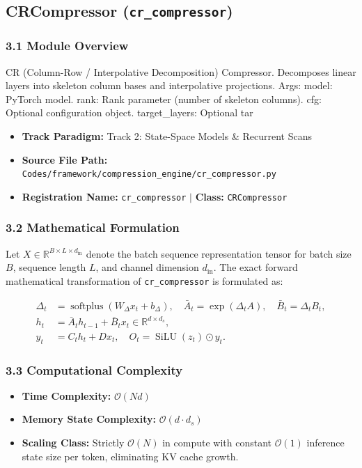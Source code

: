 \subsection{CRCompressor (\texttt{cr\_compressor})}
\label{sec:app_module_cr_compressor}

\subsubsection*{3.1 Module Overview}
CR (Column-Row / Interpolative Decomposition) Compressor. Decomposes linear layers into skeleton column bases and interpolative projections.  Args:     model: PyTorch model.     rank: Rank parameter (number of skeleton columns).     cfg: Optional configuration object.     target\_layers: Optional tar
\begin{itemize}
    \item \textbf{Track Paradigm:} Track 2: State-Space Models & Recurrent Scans
    \item \textbf{Source File Path:} \texttt{Codes/framework/compression\_engine/cr\_compressor.py}
    \item \textbf{Registration Name:} \texttt{cr\_compressor} $\mid$ \textbf{Class:} \texttt{CRCompressor}
\end{itemize}

\subsubsection*{3.2 Mathematical Formulation}
Let $X \in \mathbb{R}^{B \times L \times d_{\text{in}}}$ denote the batch sequence representation tensor for batch size $B$, sequence length $L$, and channel dimension $d_{\text{in}}$. The exact forward mathematical transformation of \texttt{cr\_compressor} is formulated as:

\begin{align}
\Delta_t &= \operatorname{softplus}(W_\Delta x_t + b_\Delta), \quad \bar{A}_t = \exp(\Delta_t A), \quad \bar{B}_t = \Delta_t B_t, \\
h_t &= \bar{A}_t h_{t-1} + \bar{B}_t x_t \in \mathbb{R}^{d \times d_s}, \\
y_t &= C_t h_t + D x_t, \quad O_t = \operatorname{SiLU}(z_t) \odot y_t.
\end{align}


\subsubsection*{3.3 Computational Complexity}
\begin{itemize}
    \item \textbf{Time Complexity:} $\mathcal{O}(N d)$
    \item \textbf{Memory State Complexity:} $\mathcal{O}(d \cdot d_s)$
    \item \textbf{Scaling Class:} Strictly $\mathcal{O}(N)$ in compute with constant $\mathcal{O}(1)$ inference state size per token, eliminating KV cache growth.
\end{itemize}

